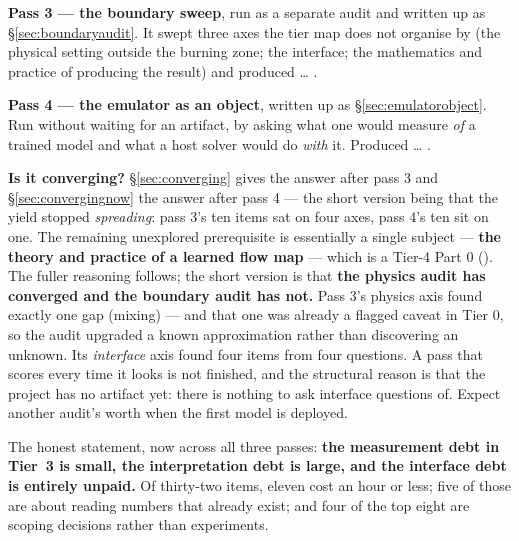 \textbf{Pass 3 --- the boundary sweep}, run as a separate audit and written
up as \S\ref{sec:boundaryaudit}. It swept three axes the tier map does not
organise by (the physical setting outside the burning zone; the interface;
the mathematics and practice of producing the result) and produced
 \ldots{} .

\textbf{Pass 4 --- the emulator as an object}, written up as
\S\ref{sec:emulatorobject}. Run without waiting for an artifact, by asking
what one would measure \emph{of} a trained model and what a host solver would
do \emph{with} it. Produced  \ldots{} .

\textbf{Is it converging?} \S\ref{sec:converging} gives the answer after
pass 3 and \S\ref{sec:convergingnow} the answer after pass 4 --- the short
version being that the yield stopped \emph{spreading}: pass 3's ten items sat
on four axes, pass 4's ten sit on one. The remaining unexplored prerequisite
is essentially a single subject --- \textbf{the theory and practice of a
learned flow map} --- which is a Tier-4 Part 0 (). The fuller
reasoning follows; the short version is that \textbf{the physics audit has
converged and the boundary audit has not.} Pass 3's physics axis found
exactly one gap (mixing) --- and that one was already a flagged caveat in
Tier 0, so the audit upgraded a known approximation rather than discovering
an unknown. Its \emph{interface} axis found four items from four questions. A
pass that scores every time it looks is not finished, and the structural
reason is that the project has no artifact yet: there is nothing to ask
interface questions of. Expect another audit's worth when the first model is
deployed.

The honest statement, now across all three passes: \textbf{the measurement
debt in Tier~3 is small, the interpretation debt is large, and the interface
debt is entirely unpaid.} Of thirty-two items, eleven cost an hour or less;
five of those are about reading numbers that already exist; and four of the
top eight are scoping decisions rather than experiments.
